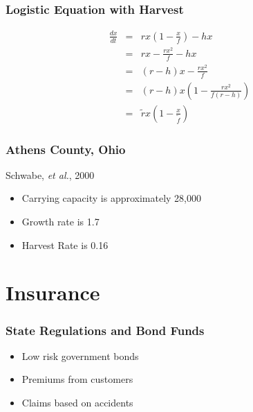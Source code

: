 \begin{frame}
    \frametitle{Logistic Equation with Harvest}
	\vspace{-1cm}
	\begin{eqnarray*}
		\frac{dx}{dt} &=& rx \left( 1-\frac{x}{f} \right) -hx\\
		 &=& rx-\frac{rx^{2}}{f}-hx\\
		 &=& (r-h)x-\frac{rx^{2}}{f}\\
		 &=& (r-h)x \left(1-\frac{rx^{2}}{f(r-h)} \right)\\
		 &=& \tilde{r}x \left( 1-\frac{x}{\tilde{f}} \right)		
	\end{eqnarray*}
\end{frame}

\begin{frame}
    \frametitle{Athens County, Ohio}
Schwabe, \emph{et al.}, 2000
	\begin{itemize}
		\item Carrying capacity is approximately 28,000
		\item Growth rate is 1.7
		\item Harvest Rate is 0.16
	\end{itemize}
\end{frame}






\section{Insurance}

\begin{frame}
    \frametitle{State Regulations and Bond Funds}
	\begin{itemize}
		\item Low risk government bonds
		\item Premiums from customers
		\item Claims based on accidents
	\end{itemize}
\end{frame}